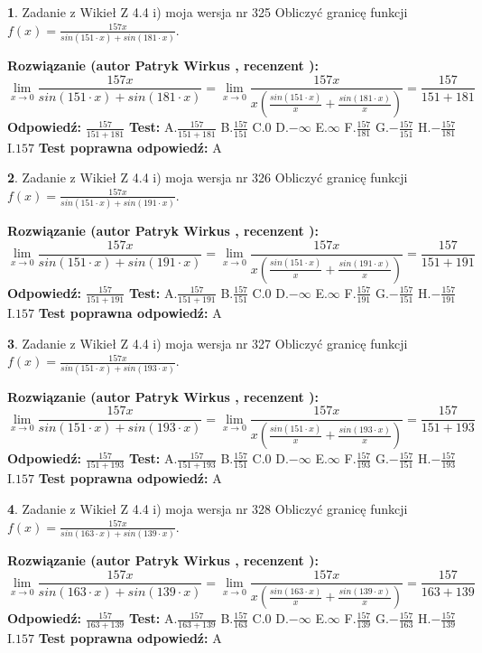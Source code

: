 \documentclass[12pt, a4paper]{article}
\theoremstyle{definition} %
\newtheorem{zad}{}
\newcommand{\zadStart}[1]{\begin{zad}#1\newline}
\newcommand{\zadStop}{\end{zad}}
\newcommand{\rozwStart}[2]{\noindent \textbf{Rozwiązanie (autor #1 , recenzent #2): }\newline}
\newcommand{\rozwStop}{\newline}
\newcommand{\odpStart}{\noindent \textbf{Odpowiedź:}\newline}
\newcommand{\odpStop}{\newline}
\newcommand{\testStart}{\noindent \textbf{Test:}\newline}
\newcommand{\testStop}{\newline}
\newcommand{\kluczStart}{\noindent \textbf{Test poprawna odpowiedź:}\newline}
\newcommand{\kluczStop}{\newline}
\begin{document}
\zadStart{Zadanie z Wikieł Z 4.4 i) moja wersja nr 325}
Obliczyć granicę funkcji $f(x)=\frac{157x}{sin(151\cdot x) +sin(181\cdot x)}$.
\zadStop
\rozwStart{Patryk Wirkus}{}
$$\lim\limits_{x\to 0}\frac{157x}{sin(151\cdot x) +sin(181\cdot x)}=\lim\limits_{x\to 0}\frac{157x}{x(\frac{sin(151\cdot x)}{x}+\frac{sin(181\cdot x)}{x})}=\frac{157}{151+181}$$
\rozwStop
\odpStart
$\frac{157}{151+181}$
\odpStop
\testStart
A.$\frac{157}{151+181}$
B.$\frac{157}{151}$
C.$0$
D.$-\infty$
E.$\infty$
F.$\frac{157}{181}$
G.$-\frac{157}{151}$
H.$-\frac{157}{181}$
I.$157$
\testStop
\kluczStart
A
\kluczStop



\zadStart{Zadanie z Wikieł Z 4.4 i) moja wersja nr 326}
Obliczyć granicę funkcji $f(x)=\frac{157x}{sin(151\cdot x) +sin(191\cdot x)}$.
\zadStop
\rozwStart{Patryk Wirkus}{}
$$\lim\limits_{x\to 0}\frac{157x}{sin(151\cdot x) +sin(191\cdot x)}=\lim\limits_{x\to 0}\frac{157x}{x(\frac{sin(151\cdot x)}{x}+\frac{sin(191\cdot x)}{x})}=\frac{157}{151+191}$$
\rozwStop
\odpStart
$\frac{157}{151+191}$
\odpStop
\testStart
A.$\frac{157}{151+191}$
B.$\frac{157}{151}$
C.$0$
D.$-\infty$
E.$\infty$
F.$\frac{157}{191}$
G.$-\frac{157}{151}$
H.$-\frac{157}{191}$
I.$157$
\testStop
\kluczStart
A
\kluczStop



\zadStart{Zadanie z Wikieł Z 4.4 i) moja wersja nr 327}
Obliczyć granicę funkcji $f(x)=\frac{157x}{sin(151\cdot x) +sin(193\cdot x)}$.
\zadStop
\rozwStart{Patryk Wirkus}{}
$$\lim\limits_{x\to 0}\frac{157x}{sin(151\cdot x) +sin(193\cdot x)}=\lim\limits_{x\to 0}\frac{157x}{x(\frac{sin(151\cdot x)}{x}+\frac{sin(193\cdot x)}{x})}=\frac{157}{151+193}$$
\rozwStop
\odpStart
$\frac{157}{151+193}$
\odpStop
\testStart
A.$\frac{157}{151+193}$
B.$\frac{157}{151}$
C.$0$
D.$-\infty$
E.$\infty$
F.$\frac{157}{193}$
G.$-\frac{157}{151}$
H.$-\frac{157}{193}$
I.$157$
\testStop
\kluczStart
A
\kluczStop



\zadStart{Zadanie z Wikieł Z 4.4 i) moja wersja nr 328}
Obliczyć granicę funkcji $f(x)=\frac{157x}{sin(163\cdot x) +sin(139\cdot x)}$.
\zadStop
\rozwStart{Patryk Wirkus}{}
$$\lim\limits_{x\to 0}\frac{157x}{sin(163\cdot x) +sin(139\cdot x)}=\lim\limits_{x\to 0}\frac{157x}{x(\frac{sin(163\cdot x)}{x}+\frac{sin(139\cdot x)}{x})}=\frac{157}{163+139}$$
\rozwStop
\odpStart
$\frac{157}{163+139}$
\odpStop
\testStart
A.$\frac{157}{163+139}$
B.$\frac{157}{163}$
C.$0$
D.$-\infty$
E.$\infty$
F.$\frac{157}{139}$
G.$-\frac{157}{163}$
H.$-\frac{157}{139}$
I.$157$
\testStop
\kluczStart
A
\kluczStop
\end{document}
